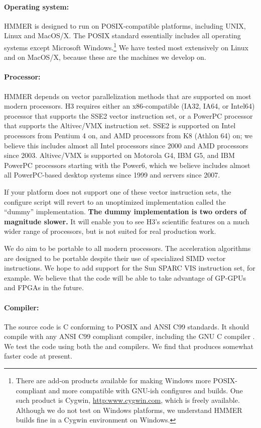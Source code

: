 \paragraph{Operating system:} HMMER is designed to run on
POSIX-compatible platforms, including UNIX, Linux and MacOS/X. The
POSIX standard essentially includes all operating systems except
Microsoft Windows.\footnote{There are add-on products available for
  making Windows more POSIX-compliant and more compatible with GNU-ish
  configures and builds. One such product is Cygwin,
  \url{http:www.cygwin.com}, which is freely available. Although we do
  not test on Windows platforms, we understand HMMER builds fine in a
  Cygwin environment on Windows.}  We have tested most extensively on
Linux and on MacOS/X, because these are the machines we develop on. 

\paragraph{Processor:} HMMER depends on vector parallelization methods
that are supported on most modern processors. H3 requires either an
x86-compatible (IA32, IA64, or Intel64) processor that supports the
SSE2 vector instruction set, or a PowerPC processor that supports the
Altivec/VMX instruction set. SSE2 is supported on Intel processors
from Pentium 4 on, and AMD processors from K8 (Athlon 64) on; we
believe this includes almost all Intel processors since 2000 and AMD
processors since 2003. Altivec/VMX is supported on Motorola G4, IBM
G5, and IBM PowerPC processors starting with the Power6, which we
believe includes almost all PowerPC-based desktop systems since 1999
and servers since 2007.

If your platform does not support one of these vector instruction
sets, the configure script will revert to an unoptimized
implementation called the ``dummy'' implementation. \textbf{The dummy
  implementation is two orders of magnitude slower.} It will enable
you to see H3's scientific features on a much wider range of
processors, but is not suited for real production work.

We do aim to be portable to all modern processors. The acceleration
algorithms are designed to be portable despite their use of
specialized SIMD vector instructions. We hope to add support for the
Sun SPARC VIS instruction set, for example. We believe that the code
will be able to take advantage of GP-GPUs and FPGAs in the future.

\paragraph{Compiler:} The source code is C conforming to POSIX and ANSI
C99 standards. It should compile with any ANSI C99 compliant compiler,
including the GNU C compiler . We test the code using both
the  and  compilers. We find that 
produces somewhat faster code at present.

